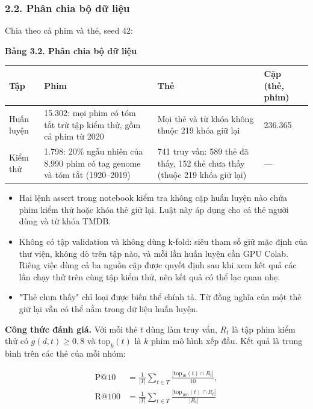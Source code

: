 \documentclass[12pt,a4paper]{article}
\providecommand{\tightlist}{\setlength{\itemsep}{0pt}\setlength{\parskip}{0pt}}
\newcommand{\npp}{\Needspace{13\baselineskip}}
\let\oldsubsubsection\subsubsection
\renewcommand{\subsubsection}{\Needspace{10\baselineskip}\oldsubsubsection}
\begin{document}
\subsubsection{2.2. Phân chia bộ dữ liệu}

Chia theo cả phim và thẻ, seed 42:

\npp\textbf{Bảng 3.2. Phân chia bộ dữ liệu}

{\def\LTcaptype{}\small
\begin{longtable}[]{@{}*{4}{P{(\linewidth - 6\tabcolsep) * }}@{}}
\toprule
\textbf{Tập} & \textbf{Phim} & \textbf{Thẻ} & \textbf{Cặp (thẻ, phim)} \\
\midrule
\endhead
\bottomrule
\endlastfoot
Huấn luyện & 15.302: mọi phim có tóm tắt trừ tập kiểm thử, gồm cả phim từ 2020 & Mọi thẻ và từ khóa không thuộc 219 khóa giữ lại & 236.365 \\
Kiểm thử & 1.798: 20\% ngẫu nhiên của 8.990 phim có tag genome và tóm tắt (1920--2019) & 741 truy vấn: 589 thẻ đã thấy, 152 thẻ chưa thấy (thuộc 219 khóa giữ lại) & --- \\
\end{longtable}
}

\begin{itemize}
\tightlist
\item Hai lệnh assert trong notebook kiểm tra không cặp huấn luyện nào chứa phim kiểm thử hoặc khóa thẻ giữ lại. Luật này áp dụng cho cả thẻ người dùng và từ khóa TMDB.
\item Không có tập validation và không dùng k-fold: siêu tham số giữ mặc định của thư viện, không dò trên tập nào, và mỗi lần huấn luyện cần GPU Colab. Riêng việc dùng cả ba nguồn cặp được quyết định sau khi xem kết quả các lần chạy thử trên cùng tập kiểm thử, nên kết quả có thể lạc quan nhẹ.
\item "Thẻ chưa thấy" chỉ loại được biến thể chính tả. Từ đồng nghĩa của một thẻ giữ lại vẫn có thể nằm trong dữ liệu huấn luyện.
\end{itemize}

\textbf{Công thức đánh giá.} Với mỗi thẻ $t$ dùng làm truy vấn, $R_t$ là tập phim kiểm thử có $g(d,t)\geq 0{,}8$ và $\mathrm{top}_k(t)$ là $k$ phim mô hình xếp đầu. Kết quả là trung bình trên các thẻ của mỗi nhóm:

\begin{align*}
\mathrm{P@10} &= \frac{1}{|T|}\sum_{t\in T}\frac{|\mathrm{top}_{10}(t)\cap R_t|}{10}, \\
\mathrm{R@100} &= \frac{1}{|T|}\sum_{t\in T}\frac{|\mathrm{top}_{100}(t)\cap R_t|}{|R_t|}
\end{align*}
\end{document}
